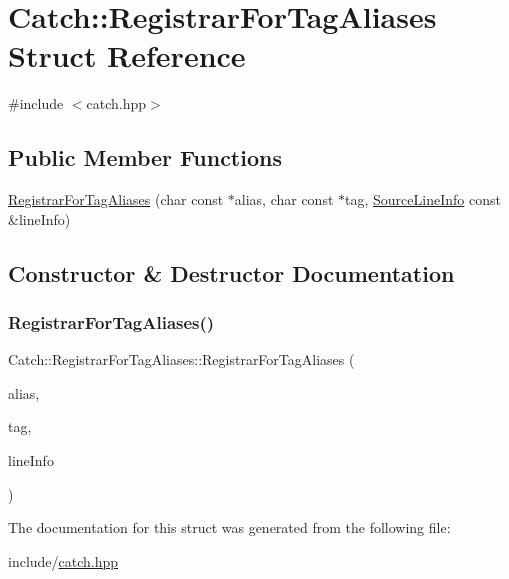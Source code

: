 \hypertarget{structCatch_1_1RegistrarForTagAliases}{}\section{Catch\+:\+:Registrar\+For\+Tag\+Aliases Struct Reference}
\label{structCatch_1_1RegistrarForTagAliases}


{\ttfamily \#include $<$catch.\+hpp$>$}

\subsection*{Public Member Functions}
\begin{DoxyCompactItemize}
\item 
\mbox{\hyperlink{structCatch_1_1RegistrarForTagAliases_ae4e45830e4763bcd65d55d8db9167b69}{Registrar\+For\+Tag\+Aliases}} (char const $\ast$alias, char const $\ast$tag, \mbox{\hyperlink{structCatch_1_1SourceLineInfo}{Source\+Line\+Info}} const \&line\+Info)
\end{DoxyCompactItemize}


\subsection{Constructor \& Destructor Documentation}
\mbox{\label{structCatch_1_1RegistrarForTagAliases_ae4e45830e4763bcd65d55d8db9167b69}} 
\subsubsection{\texorpdfstring{Registrar\+For\+Tag\+Aliases()}{RegistrarForTagAliases()}}
{\footnotesize\ttfamily Catch\+::\+Registrar\+For\+Tag\+Aliases\+::\+Registrar\+For\+Tag\+Aliases (\begin{DoxyParamCaption}\item[{char const $\ast$}]{alias,  }\item[{char const $\ast$}]{tag,  }\item[{\mbox{\hyperlink{structCatch_1_1SourceLineInfo}{Source\+Line\+Info}} const \&}]{line\+Info }\end{DoxyParamCaption})}



The documentation for this struct was generated from the following file\+:\begin{DoxyCompactItemize}
\item 
include/\mbox{\hyperlink{catch_8hpp}{catch.\+hpp}}\end{DoxyCompactItemize}

